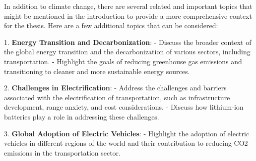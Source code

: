 In addition to climate change, there are several related and important topics that might be mentioned in the introduction to provide a more comprehensive context for the thesis. Here are a few additional topics that can be considered:

1. \textbf{Energy Transition and Decarbonization}:
   - Discuss the broader context of the global energy transition and the decarbonization of various sectors, including transportation.
   - Highlight the goals of reducing greenhouse gas emissions and transitioning to cleaner and more sustainable energy sources.

2. \textbf{Challenges in Electrification}:
   - Address the challenges and barriers associated with the electrification of transportation, such as infrastructure development, range anxiety, and cost considerations.
   - Discuss how lithium-ion batteries play a role in addressing these challenges.

3. \textbf{Global Adoption of Electric Vehicles}:
   - Highlight the adoption of electric vehicles in different regions of the world and their contribution to reducing CO2 emissions in the transportation sector.

